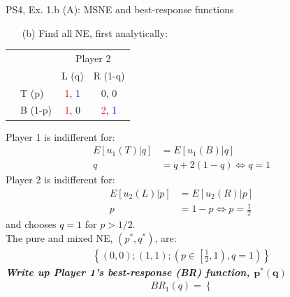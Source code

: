\begin{frame}{PS4, Ex. 1.b (A): MSNE and best-response functions}
  \begin{multicols}{2}
    \begin{itemize}
      \item[(b)] Find all NE, first analytically:
    \end{itemize}
    \begin{table}
      \begin{tabular}{cl|c|c|}
        & \multicolumn{1}{c}{} & \multicolumn{2}{c}{\color{blue}Player 2}\\
        \parbox[t]{1mm}{}
        &  &  &  \\
        & T (p) & \textcolor{red}{1}, \textcolor{blue}{1} & 0, 0 \\
        & B (1-p) & \textcolor{red}{1}, 0 & \textcolor{red}{2}, \textcolor{blue}{1} \\
      \end{tabular}
    \end{table}
    Player 1 is indifferent for:
    \begin{align*}
      E[u_1(T)|q]&=E[u_1(B)|q]\\
      q &= q + 2(1-q) \Leftrightarrow q = 1
    \end{align*}
    Player 2 is indifferent for:
    \begin{align*}
      E[u_2(L)|p]&=E[u_2(R)|p]\\
      p &= 1-p \Leftrightarrow p = \frac{1}{2}
    \end{align*}
    and chooses $q=1$ for $p>1/2$.\\\medskip
    The pure and mixed NE, $(p^{*},q^{*})$, are:
    \begin{align*}
      \left\{(0,0);(1,1);\left(p\in\left[\frac{1}{2},1\right),q=1\right)\right\}
    \end{align*}
    \textbf{\textit{Write up Player 1's best-response (BR) function, $\bm{p^{*}(q)}$}}
  \vfill\null \columnbreak
    \begin{align*}
      BR_1(q)=\left\{ \right.
    \end{align*}
  \vfill\null
  \end{multicols}
\end{frame}
